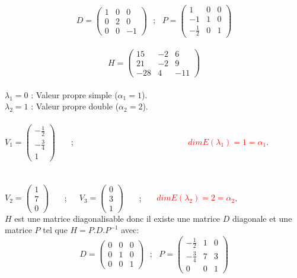 \documentclass[a4paper,12pt,french]{article}
\begin{document}
\[ D=\begin{pmatrix}
	1 & 0 & 0  \\
	0 & 2 & 0\\
   0 & 0 & -1
	
\end{pmatrix} ~~~;~~~P=\begin{pmatrix}
1 & 0 & 0  \\
-1 & 1 & 0\\
-\frac{1}{2} & 0 & 1

\end{pmatrix}
\]
 ~~~ \\
 \[ H=\begin{pmatrix}
 	15 & -2 & 6  \\
 	21 & -2 & 9\\
 	-28 & 4 & -11
 	
 \end{pmatrix}
 \]
 ~~~ \\
 $\lambda_{1}=0$ : Valeur propre simple ($\alpha_{1}=1$).\\
 $\lambda_{2}=1$ : Valeur propre double ($\alpha_{2}=2$).\\
~~~ \\
$V_{1}=\begin{pmatrix}
-\frac{1}{2}  \\
	-\frac{3}{4} \\
	1
	
	
\end{pmatrix}$ ~~~;~~~~~~~~~~~~~~~~~~~~~~~~~~~ \textcolor{red}{$dim E(\lambda_{1})=1=\alpha_{1}$}.\\
~~~ \\
~~~ \\
$V_{2}=\begin{pmatrix}
	1  \\
	7  \\
	0
	
\end{pmatrix}$ ~~~;~~~$V_{3}=\begin{pmatrix}
0  \\
3  \\
1

\end{pmatrix}$ ~~~;~~~ \textcolor{red}{$dim E(\lambda_{2})=2=\alpha_{2}$}.\\

 $H$ est une matrice diagonalisable donc il existe une matrice $D$ diagonale et une matrice $P$ tel que $H=P.D.P^{-1}$ avec:\\
 
 \[ D=\begin{pmatrix}
 	0 & 0 & 0  \\
 	0 & 1 & 0\\
 	0 & 0 & 1
 	
 \end{pmatrix} ~~~;~~~P=\begin{pmatrix}
 	-\frac{1}{2} & 1 & 0  \\
 	-\frac{3}{4} & 7 & 3\\
 	 0& 0 & 1
 	
 \end{pmatrix}
 \]
\end{document}
